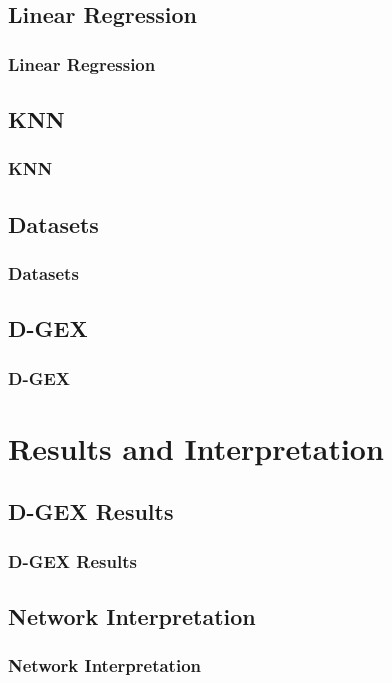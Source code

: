 \documentclass[professionalfont]{beamer}
\begin{document}
\subsection{Linear Regression}
\begin{frame}
\frametitle{Linear Regression}
\end{frame}

\subsection{KNN}
\begin{frame}
\frametitle{KNN}
\end{frame}

\subsection{Datasets}
\begin{frame}
\frametitle{Datasets}
\end{frame}

\subsection{D-GEX}
\begin{frame}
\frametitle{D-GEX}
\end{frame}

\section{Results and Interpretation}

\subsection{D-GEX Results}
\begin{frame}
\frametitle{D-GEX Results}
\end{frame}

\subsection{Network Interpretation}
\begin{frame}
\frametitle{Network Interpretation}
\end{frame}
\end{document}
